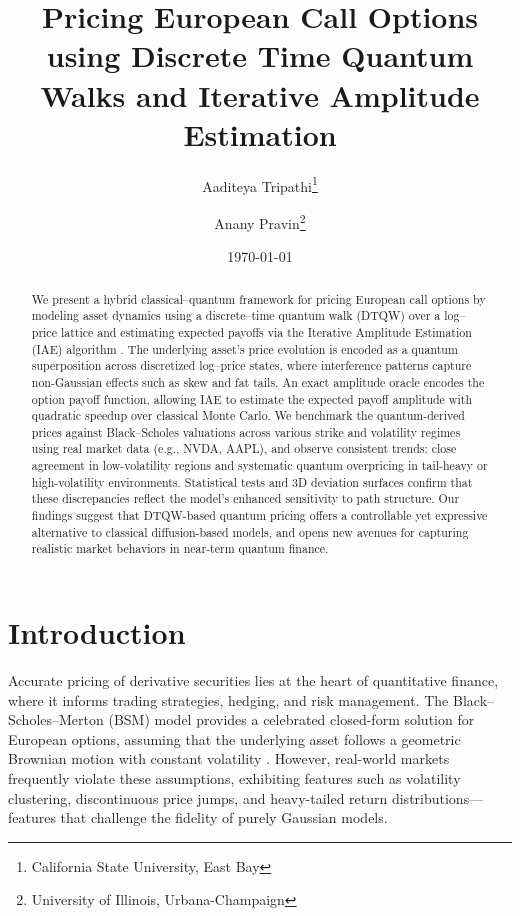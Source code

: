 \documentclass[11pt]{article}
\title{Pricing European Call Options using Discrete Time Quantum Walks and Iterative Amplitude Estimation}
\author{
  Aaditeya Tripathi\thanks{California State University, East Bay} \and
  Anany Pravin\thanks{University of Illinois, Urbana-Champaign}
}
\date{\today}
\begin{document}
\maketitle

\begin{abstract}
We present a hybrid classical–quantum framework for pricing European call options by modeling asset dynamics using a discrete–time quantum walk (DTQW) over a log–price lattice and estimating expected payoffs via the Iterative Amplitude Estimation (IAE) algorithm  \cite{grinko2019iterative}. The underlying asset’s price evolution is encoded as a quantum superposition across discretized log–price states, where interference patterns capture non-Gaussian effects such as skew and fat tails. An exact amplitude oracle encodes the option payoff function, allowing IAE to estimate the expected payoff amplitude with quadratic speedup over classical Monte Carlo. We benchmark the quantum-derived prices against Black–Scholes valuations across various strike and volatility regimes using real market data (e.g., NVDA, AAPL), and observe consistent trends: close agreement in low-volatility regions and systematic quantum overpricing in tail-heavy or high-volatility environments. Statistical tests and 3D deviation surfaces confirm that these discrepancies reflect the model’s enhanced sensitivity to path structure. Our findings suggest that DTQW-based quantum pricing offers a controllable yet expressive alternative to classical diffusion-based models, and opens new avenues for capturing realistic market behaviors in near-term quantum finance.
\end{abstract}


\section{Introduction}

Accurate pricing of derivative securities lies at the heart of quantitative finance, where it informs trading strategies, hedging, and risk management. The Black--Scholes--Merton (BSM) model provides a celebrated closed-form solution for European options, assuming that the underlying asset follows a geometric Brownian motion with constant volatility \cite{black1973pricing}. However, real-world markets frequently violate these assumptions, exhibiting features such as volatility clustering, discontinuous price jumps, and heavy-tailed return distributions—features that challenge the fidelity of purely Gaussian models.
\end{document}
